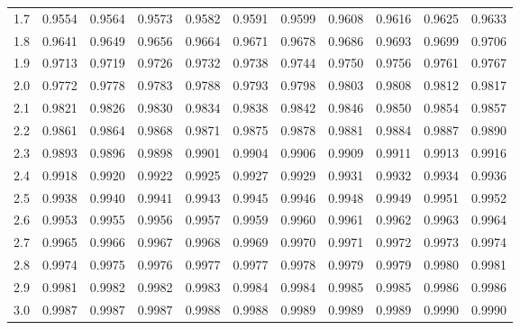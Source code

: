 \begin{minipage}{\textwidth}
\begin{tabular}{|r|rrrrrrrrrr|}
1.7&0.9554&0.9564&0.9573&0.9582&0.9591&0.9599&0.9608&0.9616&0.9625&0.9633\\
\rowcolor[gray]{.9}
1.8&0.9641&0.9649&0.9656&0.9664&0.9671&0.9678&0.9686&0.9693&0.9699&0.9706\\
1.9&0.9713&0.9719&0.9726&0.9732&0.9738&0.9744&0.9750&0.9756&0.9761&0.9767\\
\rowcolor[gray]{.9}
2.0&0.9772&0.9778&0.9783&0.9788&0.9793&0.9798&0.9803&0.9808&0.9812&0.9817\\
2.1&0.9821&0.9826&0.9830&0.9834&0.9838&0.9842&0.9846&0.9850&0.9854&0.9857\\
\rowcolor[gray]{.9}
2.2&0.9861&0.9864&0.9868&0.9871&0.9875&0.9878&0.9881&0.9884&0.9887&0.9890\\
2.3&0.9893&0.9896&0.9898&0.9901&0.9904&0.9906&0.9909&0.9911&0.9913&0.9916\\
\rowcolor[gray]{.9}
2.4&0.9918&0.9920&0.9922&0.9925&0.9927&0.9929&0.9931&0.9932&0.9934&0.9936\\
2.5&0.9938&0.9940&0.9941&0.9943&0.9945&0.9946&0.9948&0.9949&0.9951&0.9952\\
\rowcolor[gray]{.9}
2.6&0.9953&0.9955&0.9956&0.9957&0.9959&0.9960&0.9961&0.9962&0.9963&0.9964\\
2.7&0.9965&0.9966&0.9967&0.9968&0.9969&0.9970&0.9971&0.9972&0.9973&0.9974\\
\rowcolor[gray]{.9}
2.8&0.9974&0.9975&0.9976&0.9977&0.9977&0.9978&0.9979&0.9979&0.9980&0.9981\\
2.9&0.9981&0.9982&0.9982&0.9983&0.9984&0.9984&0.9985&0.9985&0.9986&0.9986\\
\rowcolor[gray]{.9}
3.0&0.9987&0.9987&0.9987&0.9988&0.9988&0.9989&0.9989&0.9989&0.9990&0.9990\\
\hline
\end{tabular}
    \end{minipage}

